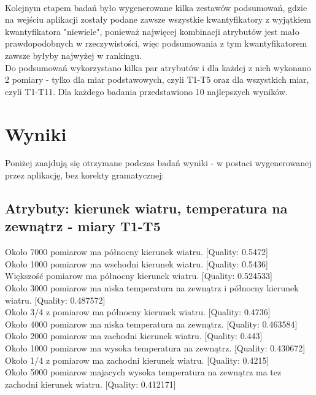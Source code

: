 \documentclass{classrep}
\begin{document}
\paragraph{}
Kolejnym etapem badań było wygenerowane kilka zestawów podsumowań, gdzie na wejściu aplikacji zostały podane zawsze wszystkie kwantyfikatory z wyjątkiem kwantyfikatora "niewiele", ponieważ najwięcej kombinacji atrybutów jest mało prawdopodobnych w rzeczywistości, więc podsumowania z tym kwantyfikatorem zawsze byłyby najwyżej w rankingu.\\
Do podsumowań wykorzystano kilka par atrybutów i dla każdej z nich wykonano 2 pomiary - tylko dla miar podstawowych, czyli T1-T5 oraz dla wszystkich miar, czyli T1-T11. Dla każdego badania przedstawiono 10 najlepszych wyników.

\section{Wyniki}
Poniżej znajdują się otrzymane podczas badań wyniki - w postaci wygenerowanej przez aplikację, bez korekty gramatycznej:

\subsection{Atrybuty: kierunek wiatru, temperatura na zewnątrz - miary T1-T5}

Około 7000 pomiarow ma północny kierunek wiatru. [Quality: 0.5472]\\
Około 1000 pomiarow ma wschodni kierunek wiatru. [Quality: 0.5436]\\
Większość pomiarow ma północny kierunek wiatru. [Quality: 0.524533]\\
Około 3000 pomiarow ma niska temperatura na zewnątrz i północny kierunek wiatru. [Quality: 0.487572]\\
Około 3/4 z pomiarow ma północny kierunek wiatru. [Quality: 0.4736]\\
Około 4000 pomiarow ma niska temperatura na zewnątrz. [Quality: 0.463584]\\
Około 2000 pomiarow ma zachodni kierunek wiatru. [Quality: 0.443]\\
Około 1000 pomiarow ma wysoka temperatura na zewnątrz. [Quality: 0.430672]\\
Około 1/4 z pomiarow ma zachodni kierunek wiatru. [Quality: 0.4215]\\
Około 5000 pomiarow majacych wysoka temperatura na zewnątrz ma tez zachodni kierunek wiatru. [Quality: 0.412171]\\
\end{document}
